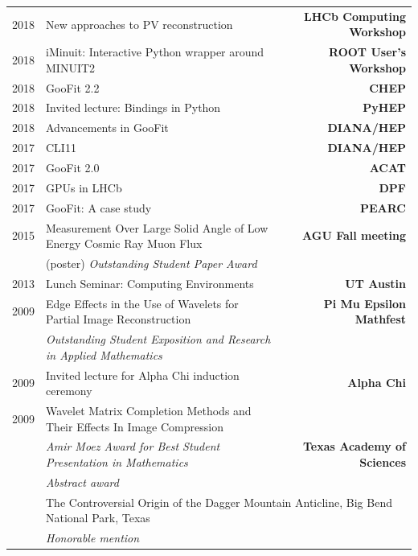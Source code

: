 \documentclass[10pt,letterpaper,english]{moderncv}
\begin{document}
\begin{tabularx}{\textwidth}{p{.35in}X>{\bfseries}r}

    2018 & New approaches to PV reconstruction & LHCb Computing Workshop \\ %
    2018 & iMinuit: Interactive Python wrapper around MINUIT2 & ROOT User's Workshop \\  %
    2018 & GooFit 2.2 & CHEP \\ %
    2018 & Invited lecture: Bindings in Python & PyHEP  \\
    2018 & Advancements in GooFit & DIANA/HEP \\
    2017 & CLI11 & DIANA/HEP \\
    2017 & GooFit 2.0 & ACAT \\
    2017 & GPUs in LHCb & DPF \\ %
    2017 & GooFit: A case study & PEARC \\


    2015 & Measurement Over Large Solid Angle of Low Energy Cosmic Ray Muon Flux &  AGU Fall meeting \\
     & (poster) \emph{Outstanding Student Paper Award} & \\
     2013 & Lunch Seminar: Computing Environments & UT Austin \\
     2009 & Edge Effects in the Use of Wavelets for Partial Image Reconstruction & Pi Mu Epsilon Mathfest \\
     & \emph{Outstanding Student Exposition and Research in Applied Mathematics} & \\

     2009 & Invited lecture for Alpha Chi induction ceremony & Alpha Chi  \\

     2009 & Wavelet Matrix Completion Methods and Their Effects In Image Compression &  \\
      & \emph{Amir Moez Award for Best Student Presentation in Mathematics} & Texas Academy of Sciences \\
      & \emph{Abstract award} & \\
      & \multicolumn{2}{l}{The Controversial Origin of the Dagger Mountain Anticline, Big Bend National Park, Texas}  \\
      & \emph{Honorable mention} & \\



\end{tabularx}
\end{document}
